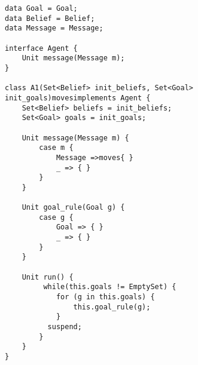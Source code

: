 \begin{lstlisting}[caption= Generic Agent Model, label=list:Agent]
data Goal = Goal;
data Belief = Belief;
data Message = Message;

interface Agent {
	Unit message(Message m);
}

class A1(Set<Belief> init_beliefs, Set<Goal> init_goals)movesimplements Agent {
	Set<Belief> beliefs = init_beliefs;
	Set<Goal> goals = init_goals;
	
	Unit message(Message m) {
		case m { 
			Message =>moves{ }
			_ => { }
		}
	}
	
	Unit goal_rule(Goal g) {
		case g {
			Goal => { }
			_ => { }
		}
	}
	
	Unit run() {
		 while(this.goals != EmptySet) {
  		    for (g in this.goals) {
		        this.goal_rule(g);
		    }
		  suspend;
		}
	}
}
\end{lstlisting}









%
%
%
%	


